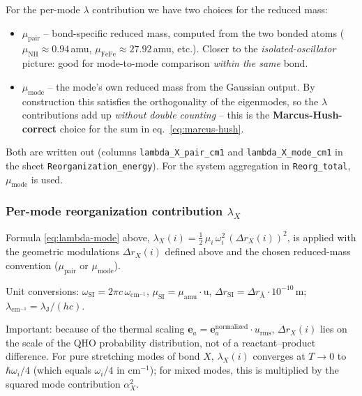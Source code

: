 \documentclass[11pt,a4paper,twoside]{article}
\theoremstyle{remark}
\begin{document}
For the per-mode $\lambda$ contribution we have two choices for
the reduced mass:

\begin{itemize}
  \item $\mu_\text{pair}$ -- bond-specific reduced mass, computed
        from the two bonded atoms ($\mu_\text{NH} \approx 0.94$\,amu,
        $\mu_\text{FeFe} \approx 27.92$\,amu, etc.). Closer to the
        \emph{isolated-oscillator} picture: good for
        mode-to-mode comparison \emph{within the same} bond.

  \item $\mu_\text{mode}$ -- the mode's own reduced mass from the
        Gaussian output. By construction this satisfies the
        orthogonality of the eigenmodes, so the $\lambda$
        contributions add up \emph{without double counting} --
        this is the \textbf{Marcus-Hush-correct} choice for the
        sum in eq.~\ref{eq:marcus-hush}.
\end{itemize}

Both are written out (columns \texttt{lambda\_X\_pair\_cm1} and
\texttt{lambda\_X\_mode\_cm1} in the sheet
\texttt{Reorganization\_energy}). For the system aggregation in
\texttt{Reorg\_total}, $\mu_\text{mode}$ is used.

\subsubsection*{Per-mode reorganization contribution $\lambda_X$}

Formula \eqref{eq:lambda-mode} above,
$\lambda_X(i) = \tfrac{1}{2}\,\mu_i\,\omega_i^2\,(\Delta r_X(i))^2$,
is applied with the geometric modulations $\Delta r_X(i)$ defined
above and the chosen reduced-mass convention ($\mu_\text{pair}$ or
$\mu_\text{mode}$).

Unit conversions: $\omega_\text{SI} = 2\pi c\,\omega_{\text{cm}^{-1}}$,
$\mu_\text{SI} = \mu_{\text{amu}} \cdot \text{u}$,
$\Delta r_\text{SI} = \Delta r_{\text{\AA}} \cdot 10^{-10}$\,m;
$\lambda_{\text{cm}^{-1}} = \lambda_\text{J} / (h c)$.

Important: because of the thermal scaling
$\mathbf{e}_a = \mathbf{e}_a^\text{normalized} \cdot u_\text{rms}$,
$\Delta r_X(i)$ lies on the scale of the QHO probability
distribution, not of a reactant--product difference. For pure
stretching modes of bond $X$, $\lambda_X(i)$ converges at $T \to 0$
to $\hbar\omega_i/4$ (which equals $\omega_i/4$ in cm$^{-1}$); for
mixed modes, this is multiplied by the squared mode contribution
$\alpha_X^2$.
\end{document}
